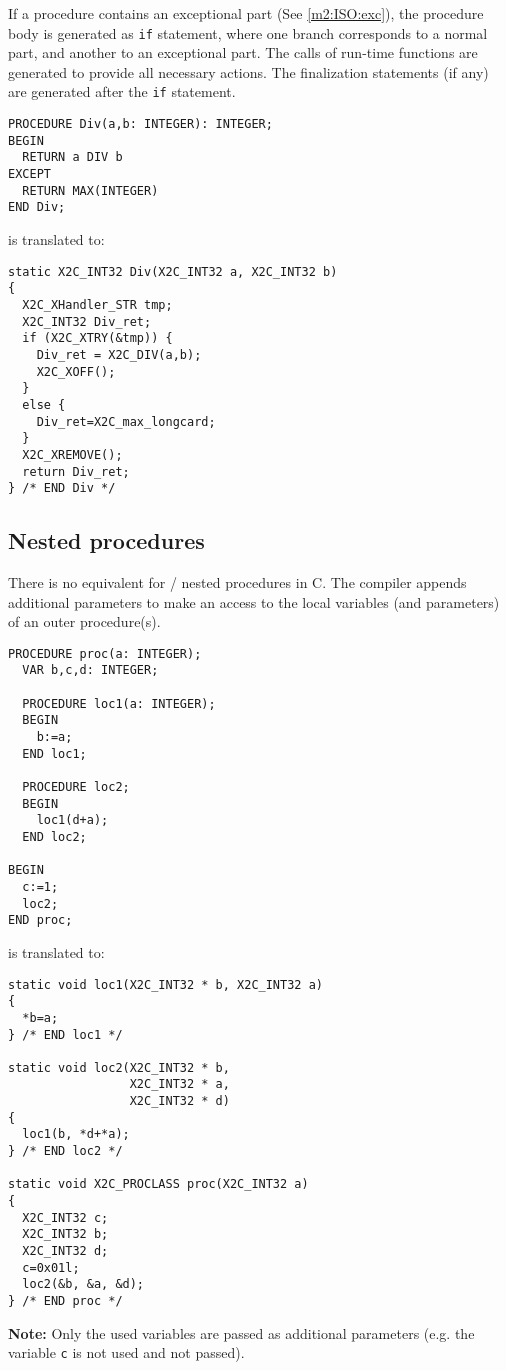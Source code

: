 If  a procedure contains an exceptional part (See \ref{m2:ISO:exc}),
the  procedure body is generated as {\tt if} statement, where one
branch  corresponds  to  a normal  part, and another to an exceptional
part.  The  calls  of run-time functions are generated to provide
all  necessary actions. The finalization statements (if any) are
generated after the {\tt if} statement.
\begin{verbatim}
PROCEDURE Div(a,b: INTEGER): INTEGER;
BEGIN
  RETURN a DIV b
EXCEPT
  RETURN MAX(INTEGER)
END Div;
\end{verbatim}
is translated to:
\begin{verbatim}
static X2C_INT32 Div(X2C_INT32 a, X2C_INT32 b)
{
  X2C_XHandler_STR tmp;
  X2C_INT32 Div_ret;
  if (X2C_XTRY(&tmp)) {
    Div_ret = X2C_DIV(a,b);
    X2C_XOFF();
  }
  else {
    Div_ret=X2C_max_longcard;
  }
  X2C_XREMOVE();
  return Div_ret;
} /* END Div */
\end{verbatim}

\subsection{Nested procedures}\label{maptoc:proc:nested}

There is no equivalent for \mt{}/\ot{} nested procedures in C.  The
compiler appends additional parameters to make an access to the local
variables (and parameters) of an outer procedure(s).

\Example
\begin{verbatim}
PROCEDURE proc(a: INTEGER);
  VAR b,c,d: INTEGER;

  PROCEDURE loc1(a: INTEGER);
  BEGIN
    b:=a;
  END loc1;

  PROCEDURE loc2;
  BEGIN
    loc1(d+a);
  END loc2;

BEGIN
  c:=1;
  loc2;
END proc;
\end{verbatim}
is translated to:
\begin{verbatim}
static void loc1(X2C_INT32 * b, X2C_INT32 a)
{
  *b=a;
} /* END loc1 */

static void loc2(X2C_INT32 * b,
                 X2C_INT32 * a,
                 X2C_INT32 * d)
{
  loc1(b, *d+*a);
} /* END loc2 */

static void X2C_PROCLASS proc(X2C_INT32 a)
{
  X2C_INT32 c;
  X2C_INT32 b;
  X2C_INT32 d;
  c=0x01l;
  loc2(&b, &a, &d);
} /* END proc */
\end{verbatim}

{\bf  Note:}  Only  the  used  variables are passed as additional
parameters (e.g. the variable {\tt c} is not used and not passed).


